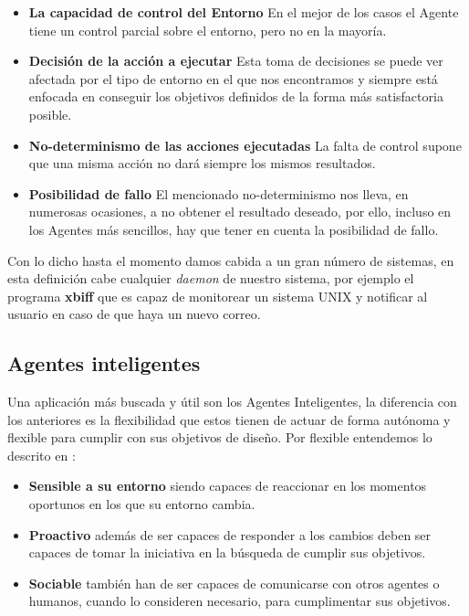 \begin{itemize}
	\item\textbf{La capacidad de control del Entorno} En el mejor de los casos el Agente tiene un control parcial sobre el entorno, pero no en la mayoría.
	\item\textbf{Decisión de la acción a ejecutar} Esta toma de decisiones se puede ver afectada por el tipo de entorno en el que nos encontramos y siempre está enfocada en conseguir los objetivos definidos de la forma más satisfactoria posible.
	\item\textbf{No-determinismo de las acciones ejecutadas} La falta de control supone que una misma acción no dará siempre los mismos resultados.
	\item\textbf{Posibilidad de fallo} El mencionado no-determinismo nos lleva, en numerosas ocasiones, a no obtener el resultado deseado, por ello, incluso en los Agentes más sencillos, hay que tener en cuenta la posibilidad de fallo.
\end{itemize}

Con lo dicho hasta el momento damos cabida a un gran número de sistemas, en esta definición cabe cualquier \textit{daemon} de nuestro sistema, por ejemplo el programa \textbf{xbiff} que es capaz de monitorear un sistema UNIX y notificar al usuario en caso de que haya un nuevo correo.

\subsection{Agentes inteligentes}

Una aplicación más buscada y útil son los Agentes Inteligentes, la diferencia con los anteriores es la flexibilidad que estos tienen de actuar de forma autónoma y flexible para cumplir con sus objetivos de diseño. Por flexible entendemos lo descrito en \cite{jennings1998agent}:

\begin{itemize}
	\item\textbf{Sensible a su entorno} siendo capaces de reaccionar en los momentos oportunos en los que su entorno cambia.
	\item\textbf{Proactivo} además de ser capaces de responder a los cambios deben ser capaces de tomar la iniciativa en la búsqueda de cumplir sus objetivos.
	\item\textbf{Sociable} también han de ser capaces de comunicarse con otros agentes o humanos, cuando lo consideren necesario, para cumplimentar sus objetivos.
\end{itemize}

